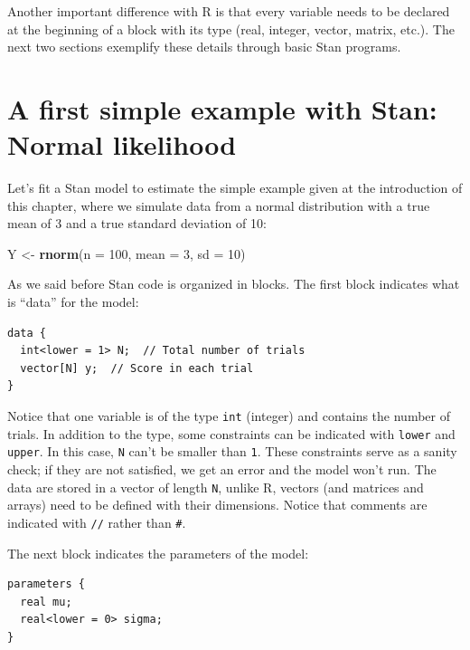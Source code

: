 \documentclass[12pt,]{krantz}
\newenvironment{Shaded}{\begin{snugshade}}{\end{snugshade}}
\newcommand{\KeywordTok}[1]{\textcolor[rgb]{0.13,0.29,0.53}{\textbf{#1}}}
\newcommand{\DataTypeTok}[1]{\textcolor[rgb]{0.13,0.29,0.53}{#1}}
\newcommand{\DecValTok}[1]{\textcolor[rgb]{0.00,0.00,0.81}{#1}}
\newcommand{\StringTok}[1]{\textcolor[rgb]{0.31,0.60,0.02}{#1}}
\newcommand{\NormalTok}[1]{#1}
\theoremstyle{definition}
\theoremstyle{definition}
\theoremstyle{definition}
\theoremstyle{remark}
\begin{document}
Another important difference with R is that every variable needs to be
declared at the beginning of a block with its type (real, integer,
vector, matrix, etc.). The next two sections exemplify these details
through basic Stan programs.

\section{A first simple example with Stan: Normal
likelihood}\label{sec:firststan}

Let's fit a Stan model to estimate the simple example given at the
introduction of this chapter, where we simulate data from a normal
distribution with a true mean of 3 and a true standard deviation of 10:

\begin{Shaded}
\begin{Highlighting}[]
\NormalTok{Y <-}\StringTok{ }\KeywordTok{rnorm}\NormalTok{(}\DataTypeTok{n =} \DecValTok{100}\NormalTok{, }\DataTypeTok{mean =} \DecValTok{3}\NormalTok{, }\DataTypeTok{sd =} \DecValTok{10}\NormalTok{)}
\end{Highlighting}
\end{Shaded}

As we said before Stan code is organized in blocks. The first block
indicates what is ``data'' for the model:

\begin{verbatim}
data {
  int<lower = 1> N;  // Total number of trials
  vector[N] y;  // Score in each trial
}
\end{verbatim}

Notice that one variable is of the type \texttt{int} (integer) and
contains the number of trials. In addition to the type, some constraints
can be indicated with \texttt{lower} and \texttt{upper}. In this case,
\texttt{N} can't be smaller than \texttt{1}. These constraints serve as
a sanity check; if they are not satisfied, we get an error and the model
won't run. The data are stored in a vector of length \texttt{N}, unlike
R, vectors (and matrices and arrays) need to be defined with their
dimensions. Notice that comments are indicated with \texttt{//} rather
than \texttt{\#}.

The next block indicates the parameters of the model:

\begin{verbatim}
parameters {
  real mu;
  real<lower = 0> sigma;
}
\end{verbatim}
\end{document}
